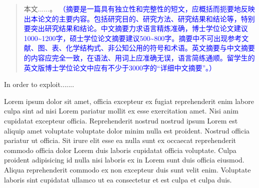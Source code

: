 %
%
%
%

\begin{abstract}
  本文......。
  \textcolor{blue}{（摘要是一篇具有独立性和完整性的短文，应概括而扼要地反映出本论文的主要内容。包括研究目的、研究方法、研究结果和结论等，特别要突出研究结果和结论。中文摘要力求语言精炼准确，博士学位论文建议1000\textasciitilde{}1200字，硕士学位论文摘要建议500\textasciitilde{}800字。摘要中不可出现参考文献、图、表、化学结构式、非公知公用的符号和术语。英文摘要与中文摘要的内容应完全一致，在语法、用词上应准确无误，语言简练通顺。留学生的英文版博士学位论文中应有不少于3000字的“详细中文摘要”。）}
\end{abstract}


\begin{abstractEn}
  In order to exploit.......

  Lorem ipsum dolor sit amet, officia excepteur ex fugiat reprehenderit enim labore culpa sint ad nisi Lorem pariatur mollit ex esse exercitation amet. Nisi anim cupidatat excepteur officia. Reprehenderit nostrud nostrud ipsum Lorem est aliquip amet voluptate voluptate dolor minim nulla est proident. Nostrud officia pariatur ut officia. Sit irure elit esse ea nulla sunt ex occaecat reprehenderit commodo officia dolor Lorem duis laboris cupidatat officia voluptate. Culpa proident adipisicing id nulla nisi laboris ex in Lorem sunt duis officia eiusmod. Aliqua reprehenderit commodo ex non excepteur duis sunt velit enim. Voluptate laboris sint cupidatat ullamco ut ea consectetur et est culpa et culpa duis.
\end{abstractEn}
